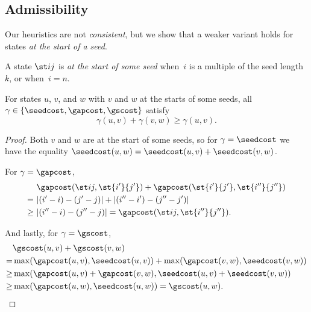 \subsection{Admissibility}\label{sec:admissible-proof}

Our heuristics are not \emph{consistent}, but we show that a weaker variant
holds for states \emph{at the start of a seed}.

\begin{definition}
A state $\st ij$ is \emph{at the start of some seed} when~$i$ is a multiple
of the seed length $k$, or when~$i=n$.
\end{definition}

\begin{lem}\label{lem:weaktriangle} For states $u$,
  $v$, and $w$ with $v$ and $w$ at the starts of some seeds, all $\gamma \in
  \{\seedcost, \gapcost, \gscost\}$ satisfy
  \begin{equation*}
  {\gamma(u, v) +
  \gamma(v, w) \geq \gamma(u, v)}.
  \end{equation*}
\end{lem}
\begin{proof}
  Both $v$ and $w$ are at the start of some seeds, so for $\gamma=\seedcost$ we
  have the equality $\seedcost(u, w) = \seedcost(u, v) + \seedcost(v, w)$.

  For $\gamma = \gapcost$,
  \begin{align*}
    &\gapcost(\st ij, \st {i'}{j'}) + \gapcost(\st{i'}{j'}, \st{i''}{j''})\\
    =\ &
    |(i'-i) - (j'-j)| + |(i''-i') - (j''-j')|\\
    \geq\ &
    |(i''-i)-(j''-j)| = \gapcost(\st ij, \st{i''}{j''}).
  \end{align*}

  And lastly, for $\gamma=\gscost$,
  \begin{align*}
  &\gscost(u, v) + \gscost(v, w)\\
  = &\max(\gapcost(u,v), \seedcost(u, v)) + \max(\gapcost(v, w), \seedcost(v, w))\\
  \geq &\max(\gapcost(u, v)+ \gapcost(v, w), \seedcost(u, v) + \seedcost(v, w))\\
  \geq &\max(\gapcost(u, w), \seedcost(u, w))
  = \gscost(u, w). \qedhere
  \end{align*}
\end{proof}

